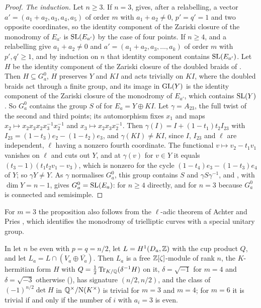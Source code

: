 \begin{proof}
\emph{The induction.} Let $n\ge3$. If $n=3$,  gives,
after a relabelling, a vector $a'=(a_{1}+a_{2},a_{3},a_{4},a_{5})$ of order $m$
with $a_{1}+a_{2}\ne0$, $p'=q'=1$ and two opposite coordinates, so the
identity component of the Zariski closure of the monodromy of $E_{a'}$ is
$\operatorname{SL}(E_{a'})$ by the case of four points. If $n\ge4$,  and
a relabelling give $a_{1}+a_{2}\ne0$ and $a'=(a_{1}+a_{2},a_{3},\dots,a_{k})$
of order $m$ with $p',q'\ge1$, and by induction on $n$ that identity
component contains $\operatorname{SL}(E_{a'})$. Let $H$ be the identity component of the
Zariski closure of the doubled braids of . Then
$H\subseteq G_{a}^{0}$, $H$ preserves $Y$ and $KI$ and acts trivially on
$KI$, where the doubled braids act through a finite group, and its image in
$\operatorname{GL}(Y)$ is the identity component of the Zariski closure of the monodromy of
$E_{a'}$, which contains $\operatorname{SL}(Y)$. So $G_{a}^{0}$ contains the group $S$ of
 for $E_{a}=Y\oplus KI$. Let $\gamma=A_{23}$, the full
twist of the second and third points; its automorphism fixes $x_{1}$ and
maps $x_{2}\mapsto x_{2}x_{3}x_{2}x_{3}^{-1}x_{2}^{-1}$ and $x_{3}\mapsto
x_{2}x_{3}x_{2}^{-1}$. Then $\gamma(I)=I+(1-t_{1})t_{2}I_{23}$ with
$I_{23}=(1-t_{3})e_{2}-(1-t_{2})e_{3}$, and $\gamma(KI)\ne KI$, since $I$,
$I_{23}$ and $\ell$ are independent, $\ell$ having a nonzero fourth
coordinate. The functional $v\mapsto v_{2}-t_{1}v_{1}$ vanishes on $\ell$ and
cuts out $Y$, and at $\gamma(v)$ for $v\in Y$ it equals
$(t_{3}-1)(t_{1}t_{2}v_{1}-v_{3})$, which is nonzero for the cycle
$(1-t_{4})e_{3}-(1-t_{3})e_{4}$ of $Y$; so $\gamma Y\ne Y$. As $\gamma$
normalises $G_{a}^{0}$, this group contains $S$ and $\gamma S\gamma^{-1}$,
and , with $\dim Y=n-1$, gives
$G_{a}^{0}=\operatorname{SL}(E_{a})$: for $n\ge4$ directly, and for $n=3$ because
$G_{a}^{0}$ is connected and semisimple.
\end{proof}

For $m=3$ the proposition also follows from the $\ell$-adic theorem of
Achter and Pries \cite[Corollary~3.10]{AP07}, which identifies the monodromy
of trielliptic curves with a special unitary group.

\begin{lemma}\label{lem:newdisc}
In  let $n$ be even with $p=q=n/2$, let
$L=H^{1}(D_{a},\mathbb{Z})$ with the cup product $Q$, and let
$L_{a}=L\cap(V_{a}\oplus\overline{V_{a}})$. Then $L_{a}$ is a free
$\mathbb{Z}[\zeta]$-module of rank $n$, the $K$-hermitian form $H$ with
$Q=\tfrac12\operatorname{Tr}_{K/\mathbb{Q}}(\delta^{-1}H)$ on it, $\delta=\sqrt{-1}$ for $m=4$ and
$\delta=\sqrt{-3}$ otherwise (), has signature
$(n/2,n/2)$, and the class of $(-1)^{n/2}\det H$ in
$\mathbb{Q}^{\times}/\mathrm{N}(K^{\times})$ is trivial for $m=3$ and $m=4$; for $m=6$ it is
trivial if and only if the number of $i$ with $a_{i}=3$ is even.
\end{lemma}

